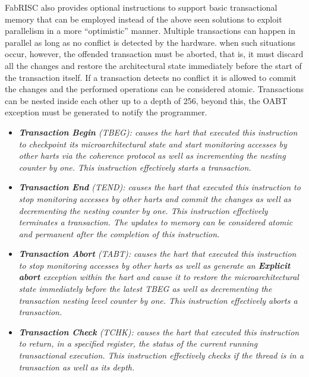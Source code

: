 \documentclass{article}
\begin{document}
            FabRISC also provides optional instructions to support basic transactional memory that can be employed instead of the above seen solutions to exploit parallelism in a more ``optimistic'' manner. Multiple transactions can happen in parallel as long as no conflict is detected by the hardware. when such situations occur, however, the offended transaction must be aborted, that is, it must discard all the changes and restore the architectural state immediately before the start of the transaction itself. If a transaction detects no conflict it is allowed to commit the changes and the performed operations can be considered atomic. Transactions can be nested inside each other up to a depth of 256, beyond this, the OABT exception must be generated to notify the programmer.

            \begin{itemize}

                \item \textit{\textbf{Transaction Begin} (TBEG): causes the hart that executed this instruction to checkpoint its microarchitectural state and start monitoring accesses by other harts via the coherence protocol as well as incrementing the nesting counter by one. This instruction effectively starts a transaction.}

                \item \textit{\textbf{Transaction End} (TEND): causes the hart that executed this instruction to stop monitoring accesses by other harts and commit the changes as well as decrementing the nesting counter by one. This instruction effectively terminates a transaction. The updates to memory can be considered atomic and permanent after the completion of this instruction.}

                \item \textit{\textbf{Transaction Abort} (TABT): causes the hart that executed this instruction to stop monitoring accesses by other harts as well as generate an \textbf{Explicit abort} exception within the hart and cause it to restore the microarchitectural state immediately before the latest TBEG as well as decrementing the transaction nesting level counter by one. This instruction effectively aborts a transaction.}

                \item \textit{\textbf{Transaction Check} (TCHK): causes the hart that executed this instruction to return, in a specified register, the status of the current running transactional execution. This instruction effectively checks if the thread is in a transaction as well as its depth.}

            \end{itemize}
\end{document}
